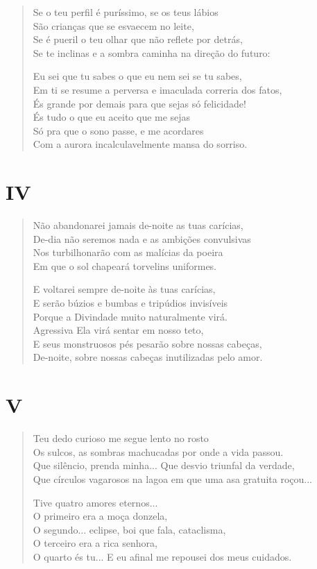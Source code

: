 \begin{verse}
Se o teu perfil é puríssimo, se os teus lábios\\
São crianças que se esvaecem no leite,\\
Se é pueril o teu olhar que não reflete por detrás,\\
Se te inclinas e a sombra caminha na direção do futuro:

Eu sei que tu sabes o que eu nem sei se tu sabes,\\
Em ti se resume a perversa e imaculada correria dos fatos,\\
És grande por demais para que sejas só felicidade!\\
És tudo o que eu aceito que me sejas\\
Só pra que o sono passe, e me acordares\\
Com a aurora incalculavelmente mansa do sorriso.
\end{verse}

\medskip
\section{IV}

\begin{verse}
Não abandonarei jamais de-noite as tuas carícias,\\
De-dia não seremos nada e as ambições convulsivas\\
Nos turbilhonarão com as malícias da poeira\\
Em que o sol chapeará torvelins uniformes.

E voltarei sempre de-noite às tuas carícias,\\
E serão búzios e bumbas e tripúdios invisíveis\\
Porque a Divindade muito naturalmente virá.\\
Agressiva Ela virá sentar em nosso teto,\\
E seus monstruosos pés pesarão sobre nossas cabeças,\\
De-noite, sobre nossas cabeças inutilizadas pelo amor.
\end{verse}

\medskip
\section{V}

\begin{verse}
Teu dedo curioso me segue lento no rosto\\
Os sulcos, as sombras machucadas por onde a vida passou.\\
Que silêncio, prenda minha... Que desvio triunfal da verdade,\\
Que círculos vagarosos na lagoa em que uma asa gratuita roçou...

Tive quatro amores eternos...\\
O primeiro era a moça donzela,\\
O segundo... eclipse, boi que fala, cataclisma,\\
O terceiro era a rica senhora,\\
O quarto és tu... E eu afinal me repousei dos meus cuidados.
\end{verse}

